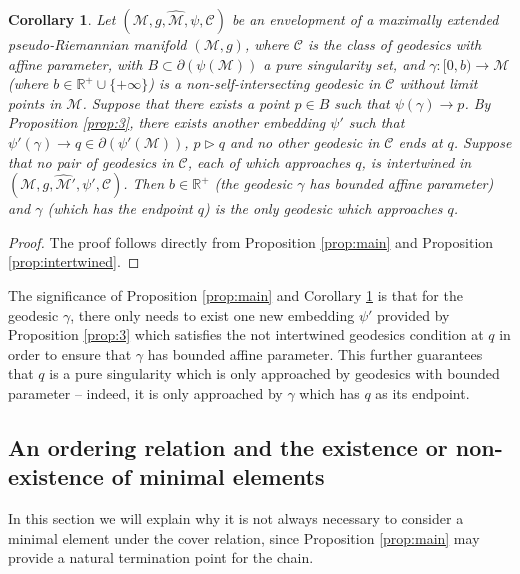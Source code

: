 \documentclass[pdflatex,sn-mathphys-num]{sn-jnl}
\newtheorem{cor}[theorem]{Corollary}
\theoremstyle{definition}
\begin{document}
\begin{cor}\label{cor:2}
    Let $(\mathcal{M},g,\hat{\mathcal{M}},\psi,\mathcal{C})$ be an envelopment of a maximally extended pseudo-Riemannian manifold $(\mathcal{M},g)$, where $\mathcal{C}$ is the class of geodesics with affine parameter, with $B \subset \partial(\psi(\mathcal{M}))$ a pure singularity set, and $\gamma: [0,b) \rightarrow \mathcal{M}$ (where $b \in \mathbb{R}^+ \cup \{+\infty\}$) is a non-self-intersecting geodesic in $\mathcal{C}$ without limit points in $\mathcal{M}$. Suppose that there exists a point $p \in B$ such that $\psi(\gamma) \rightarrow p$. By Proposition \ref{prop:3}, there exists another embedding $\psi'$ such that $\psi'(\gamma) \rightarrow q \in \partial(\psi'(\mathcal{M}))$, $p \vartriangleright q$ and no other geodesic in $\mathcal{C}$ ends at $q$. Suppose that no pair of geodesics in $\mathcal{C}$, each of which approaches $q$, is intertwined in $(\mathcal{M},g,\hat{\mathcal{M}}',\psi',\mathcal{C})$. Then $b \in \mathbb{R}^{+}$ (the geodesic $\gamma$ has bounded affine parameter)  and $\gamma$ (which has the endpoint $q$) is the only geodesic which approaches $q$.
\end{cor}
\begin{proof}
    The proof follows directly from Proposition \ref{prop:main} and Proposition \ref{prop:intertwined}.
\end{proof}
The significance of Proposition \ref{prop:main} and Corollary \ref{cor:2} is that for the geodesic $\gamma$, there only needs to exist one new embedding $\psi'$ provided by Proposition \ref{prop:3} which satisfies the not intertwined geodesics condition at $q$ in order to ensure that $\gamma$ has bounded affine parameter. This further guarantees that $q$ is a pure singularity which is only approached by geodesics with bounded parameter -- indeed, it is only approached  by $\gamma$ which has $q$ as its endpoint.

\subsection{An ordering relation and the existence or non-existence of minimal elements}\label{Section Ordering}

In this section we will explain why it is not always necessary to consider a minimal element under the cover relation, since Proposition \ref{prop:main} may provide a natural termination point for the chain.
\end{document}
